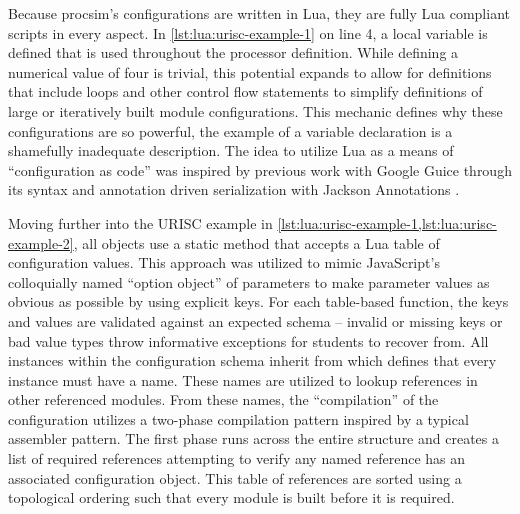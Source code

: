 Because procsim's configurations are written in Lua, they are fully Lua compliant scripts in every aspect. In \cref{lst:lua:urisc-example-1} on line 4, a local variable is defined that is used throughout the processor definition. While defining a numerical value of four is trivial, this potential expands to allow for definitions that include loops and other control flow statements to simplify definitions of large or iteratively built module configurations. This mechanic defines why these configurations are so powerful, the example of a variable declaration is a shamefully inadequate description. The idea to utilize Lua as a means of ``configuration as code'' was inspired by previous work with Google Guice through its  syntax \cite{Google:Guice:Motiviation} and annotation driven serialization with Jackson Annotations \cite{GitHub:Jackson:Annotations}.

Moving further into the URISC example in \cref{lst:lua:urisc-example-1,lst:lua:urisc-example-2}, all objects use a static  method that accepts a Lua table of configuration values. This approach was utilized to mimic JavaScript's colloquially named ``option object'' of parameters to make parameter values as obvious as possible by using explicit keys. For each table-based function, the keys and values are validated against an expected schema -- invalid or missing keys or bad value types throw informative exceptions for students to recover from. All instances within the configuration schema inherit from  which defines that every instance must have a name. These names are utilized to lookup references in other referenced modules. From these names, the ``compilation'' of the configuration utilizes a two-phase compilation pattern inspired by a typical assembler pattern. The first phase runs across the entire structure and creates a list of required references attempting to verify any named reference has an associated configuration object. This table of references are sorted using a topological ordering such that every module is built before it is required. 

